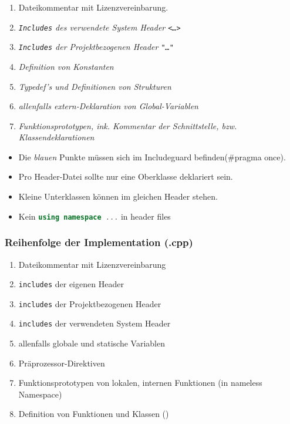 \begin{enumerate}[itemsep=1pt, parsep=0pt]
    \item Dateikommentar mit Lizenzvereinbarung.
    \item \textit{\color{blue} \texttt{Includes} des verwendete System Header \texttt{<\dots>}}
    \item \textit{\color{blue} \texttt{Includes} der Projektbezogenen Header \texttt{"\dots"}}
    \item \textit{\color{blue} Definition von Konstanten}
    \item \textit{\color{blue} Typedef's und Definitionen von Strukturen}
    \item \textit{\color{blue} allenfalls extern-Deklaration von Global-Variablen}
    \item \textit{\color{blue} Funktionsprototypen, ink. Kommentar der Schnittstelle, bzw. Klassendeklarationen}
\end{enumerate}

\begin{itemize}
    \item Die \textit{blauen} Punkte müssen sich im Includeguard befinden(\#pragma once). 
    \item Pro Header-Datei sollte nur eine Oberklasse deklariert sein. 
    \item Kleine Unterklassen können im gleichen Header stehen.
    \item Kein \lstinline[language=C++]|using namespace ...| in header files
\end{itemize}

\subsubsection{Reihenfolge der Implementation (.cpp)}

\begin{enumerate}[itemsep=1pt, parsep=0pt]
    \item Dateikommentar mit Lizenzvereinbarung
    \item \texttt{includes} der eigenen Header
    \item \texttt{includes} der Projektbezogenen Header
    \item \texttt{includes} der verwendeten System Header
    \item allenfalls globale und statische Variablen
    \item Präprozessor-Direktiven
    \item Funktionsprototypen von lokalen, internen Funktionen (in nameless Namespace)
    \item Definition von Funktionen und Klassen ()
\end{enumerate}

